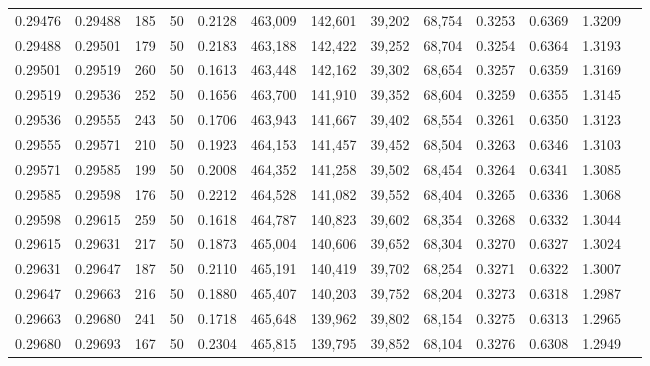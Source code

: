 \begin{tabular}{rrrrrrrrrrrrr}
0.29476 & 0.29488 &   185 &  50 &                                     0.2128 & 463,009 & 142,601 &  39,202 &  68,754 & 0.3253 & 0.6369 & 1.3209 \\
0.29488 & 0.29501 &   179 &  50 &                                     0.2183 & 463,188 & 142,422 &  39,252 &  68,704 & 0.3254 & 0.6364 & 1.3193 \\
0.29501 & 0.29519 &   260 &  50 &                                     0.1613 & 463,448 & 142,162 &  39,302 &  68,654 & 0.3257 & 0.6359 & 1.3169 \\
0.29519 & 0.29536 &   252 &  50 &                                     0.1656 & 463,700 & 141,910 &  39,352 &  68,604 & 0.3259 & 0.6355 & 1.3145 \\
0.29536 & 0.29555 &   243 &  50 &                                     0.1706 & 463,943 & 141,667 &  39,402 &  68,554 & 0.3261 & 0.6350 & 1.3123 \\
0.29555 & 0.29571 &   210 &  50 &                                     0.1923 & 464,153 & 141,457 &  39,452 &  68,504 & 0.3263 & 0.6346 & 1.3103 \\
0.29571 & 0.29585 &   199 &  50 &                                     0.2008 & 464,352 & 141,258 &  39,502 &  68,454 & 0.3264 & 0.6341 & 1.3085 \\
0.29585 & 0.29598 &   176 &  50 &                                     0.2212 & 464,528 & 141,082 &  39,552 &  68,404 & 0.3265 & 0.6336 & 1.3068 \\
0.29598 & 0.29615 &   259 &  50 &                                     0.1618 & 464,787 & 140,823 &  39,602 &  68,354 & 0.3268 & 0.6332 & 1.3044 \\
0.29615 & 0.29631 &   217 &  50 &                                     0.1873 & 465,004 & 140,606 &  39,652 &  68,304 & 0.3270 & 0.6327 & 1.3024 \\
0.29631 & 0.29647 &   187 &  50 &                                     0.2110 & 465,191 & 140,419 &  39,702 &  68,254 & 0.3271 & 0.6322 & 1.3007 \\
0.29647 & 0.29663 &   216 &  50 &                                     0.1880 & 465,407 & 140,203 &  39,752 &  68,204 & 0.3273 & 0.6318 & 1.2987 \\
0.29663 & 0.29680 &   241 &  50 &                                     0.1718 & 465,648 & 139,962 &  39,802 &  68,154 & 0.3275 & 0.6313 & 1.2965 \\
0.29680 & 0.29693 &   167 &  50 &                                     0.2304 & 465,815 & 139,795 &  39,852 &  68,104 & 0.3276 & 0.6308 & 1.2949 \\

\end{tabular}

